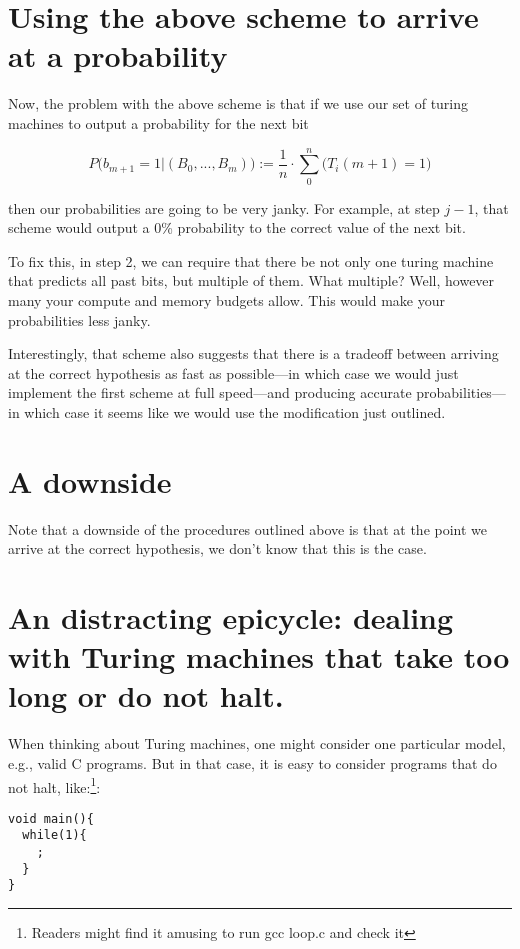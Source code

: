 \documentclass[12pt,authoryear]{elsarticle}
\begin{document}
\section{Using the above scheme to arrive at a probability }

Now, the problem with the above scheme is that if we use our set of turing machines to output a probability for the next bit

$$ P\Big(b_{m + 1} = 1 | (B_0, ..., B_m) \Big) := \frac{1}{n} \cdot \sum_0^n \Big(T_i(m+1) = 1\Big) $$

then our probabilities are going to be very janky. For example, at step $ j - 1 $, that scheme would output a 0\% probability to the correct value of the next bit.

To fix this, in step 2, we can require that there be not only one turing machine that predicts all past bits, but multiple of them. What multiple? Well, however many your compute and memory budgets allow. This would make your probabilities less janky. 

Interestingly, that scheme also suggests that there is a tradeoff between arriving at the correct hypothesis as fast as possible—in which case we would just implement the first scheme at full speed—and producing accurate probabilities—in which case it seems like we would use the modification just outlined.

\section{A downside}

Note that a downside of the procedures outlined above is that at the point we arrive at the correct hypothesis, we don't know that this is the case.

\section{An distracting epicycle: dealing with Turing machines that take too long or do not halt.}

When thinking about Turing machines, one might consider one particular model, e.g., valid C programs. But in that case, it is easy to consider programs that do not halt, like:\footnote{Readers might find it amusing to run gcc loop.c and check it}:

\begin{verbatim}
void main(){
  while(1){
    ;
  }
}
\end{verbatim}
\end{document}
